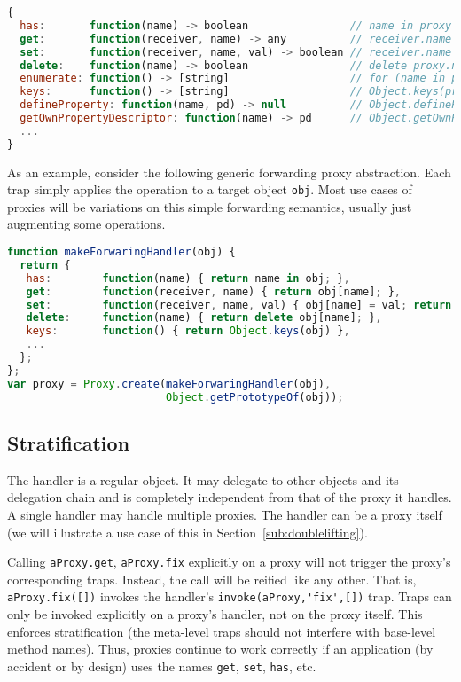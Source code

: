 \documentclass{acm_proc_article-sp}
\begin{document}
\begin{lstlisting}[language=javascript]
{
  has:       function(name) -> boolean                // name in proxy
  get:       function(receiver, name) -> any          // receiver.name
  set:       function(receiver, name, val) -> boolean // receiver.name = val
  delete:    function(name) -> boolean                // delete proxy.name
  enumerate: function() -> [string]                   // for (name in proxy)
  keys:      function() -> [string]                   // Object.keys(proxy)
  defineProperty: function(name, pd) -> null          // Object.defineProperty(proxy,name,pd)
  getOwnPropertyDescriptor: function(name) -> pd      // Object.getOwnPropertyDescriptor(name)
  ...
}
\end{lstlisting}

As an example, consider the following generic forwarding proxy abstraction. Each trap simply applies the operation to a target object \texttt{obj}. Most use cases of proxies will be variations on this simple forwarding semantics, usually just augmenting some operations.

\begin{lstlisting}[language=javascript]
function makeForwaringHandler(obj) {
  return {
   has:        function(name) { return name in obj; },
   get:        function(receiver, name) { return obj[name]; },
   set:        function(receiver, name, val) { obj[name] = val; return true; },
   delete:     function(name) { return delete obj[name]; },
   keys:       function() { return Object.keys(obj) },
   ...
  };
};
var proxy = Proxy.create(makeForwaringHandler(obj),
                         Object.getPrototypeOf(obj));
\end{lstlisting}

\subsection{Stratification}

The handler is a regular object. It may delegate to other objects and its delegation chain and is completely independent from that of the proxy it handles. A single handler may handle multiple proxies. The handler can be a proxy itself (we will illustrate a use case of this in Section~\ref{sub:doublelifting}).

Calling \lstinline{aProxy.get}, \lstinline{aProxy.fix} explicitly on a proxy will not trigger the proxy’s corresponding traps. Instead, the call will be reified like any other. That is, \lstinline{aProxy.fix([])} invokes the handler’s \lstinline{invoke(aProxy,'fix',[])} trap. Traps can only be invoked explicitly on a proxy’s handler, not on the proxy itself. This enforces stratification (the meta-level traps should not interfere with base-level method names). Thus, proxies continue to work correctly if an application (by accident or by design) uses the names \texttt{get}, \texttt{set}, \texttt{has}, etc.
\end{document}
